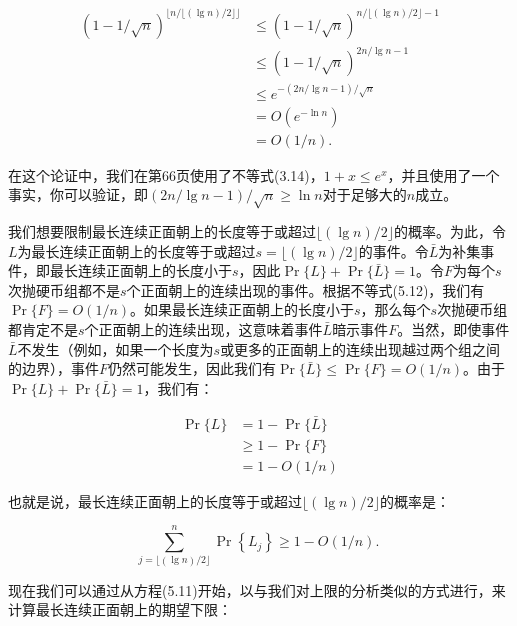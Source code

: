 \documentclass[lang=cn,newtx,10pt,scheme=chinese]{elegantbook}
\begin{document}
$$
\begin{aligned}
(1-1 / \sqrt{n})^{\lfloor n /\lfloor(\lg n) / 2\rfloor\rfloor} & \leq(1-1 / \sqrt{n})^{n /\lfloor(\lg n) / 2\rfloor-1} \\
& \leq(1-1 / \sqrt{n})^{2 n / \lg n-1} \\
& \leq e^{-(2 n / \lg n-1) / \sqrt{n}} \\
& =O\left(e^{-\ln n}\right) \\
& =O(1 / n) .
\end{aligned}
$$

在这个论证中，我们在第66页使用了不等式(3.14)，$1+x \leq e^x$，并且使用了一个事实，你可以验证，即$(2n/\lg n-1)/\sqrt{n}\geq \ln n$对于足够大的$n$成立。

我们想要限制最长连续正面朝上的长度等于或超过$\lfloor(\lg n) / 2\rfloor$的概率。为此，令$L$为最长连续正面朝上的长度等于或超过$s=\lfloor(\lg n) / 2\rfloor$的事件。令$\bar{L}$为补集事件，即最长连续正面朝上的长度小于$s$，因此$\operatorname{Pr}\{L\}+\operatorname{Pr}\{\bar{L}\}=1$。令$F$为每个$s$次抛硬币组都不是$s$个正面朝上的连续出现的事件。根据不等式(5.12)，我们有$\operatorname{Pr}\{F\}=O(1/n)$。如果最长连续正面朝上的长度小于$s$，那么每个$s$次抛硬币组都肯定不是$s$个正面朝上的连续出现，这意味着事件$\bar{L}$暗示事件$F$。当然，即使事件$\bar{L}$不发生（例如，如果一个长度为$s$或更多的正面朝上的连续出现越过两个组之间的边界），事件$F$仍然可能发生，因此我们有$\operatorname{Pr}\{\bar{L}\}\leq \operatorname{Pr}\{F\}=O(1/n)$。由于$\operatorname{Pr}\{L\}+\operatorname{Pr}\{\bar{L}\}=1$，我们有：

$$
\begin{aligned}
\operatorname{Pr}\{L\} & =1-\operatorname{Pr}\{\bar{L}\} \\
& \geq 1-\operatorname{Pr}\{F\} \\
& =1-O(1 / n)
\end{aligned}
$$

也就是说，最长连续正面朝上的长度等于或超过$\lfloor(\lg n) / 2\rfloor$的概率是：

$$
\sum_{j=\lfloor(\lg n) / 2\rfloor}^n \operatorname{Pr}\left\{L_j\right\} \geq 1-O(1 / n) \text {. }
$$

现在我们可以通过从方程(5.11)开始，以与我们对上限的分析类似的方式进行，来计算最长连续正面朝上的期望下限：
\end{document}
